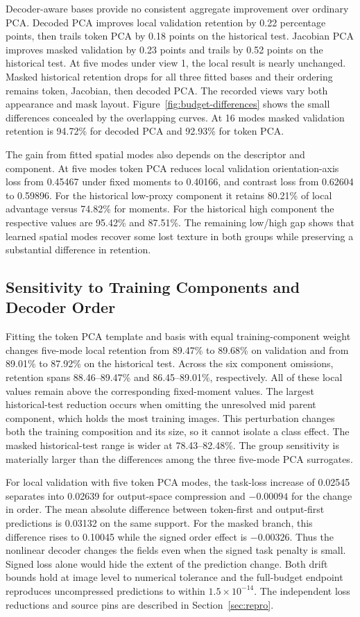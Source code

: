 Decoder-aware bases provide no consistent aggregate improvement over ordinary PCA. Decoded PCA improves local validation retention by 0.22 percentage points, then trails token PCA by 0.18 points on the historical test. Jacobian PCA improves masked validation by 0.23 points and trails by 0.52 points on the historical test. At five modes under view 1, the local result is nearly unchanged. Masked historical retention drops for all three fitted bases and their ordering remains token, Jacobian, then decoded PCA. The recorded views vary both appearance and mask layout. Figure~\ref{fig:budget-differences} shows the small differences concealed by the overlapping curves. At 16 modes masked validation retention is 94.72\% for decoded PCA and 92.93\% for token PCA.

The gain from fitted spatial modes also depends on the descriptor and component. At five modes token PCA reduces local validation orientation-axis loss from 0.45467 under fixed moments to 0.40166, and contrast loss from 0.62604 to 0.59896. For the historical low-proxy component it retains 80.21\% of local advantage versus 74.82\% for moments. For the historical high component the respective values are 95.42\% and 87.51\%. The remaining low/high gap shows that learned spatial modes recover some lost texture in both groups while preserving a substantial difference in retention.

\subsection{Sensitivity to Training Components and Decoder Order}
Fitting the token PCA template and basis with equal training-component weight changes five-mode local retention from 89.47\% to 89.68\% on validation and from 89.01\% to 87.92\% on the historical test. Across the six component omissions, retention spans 88.46--89.47\% and 86.45--89.01\%, respectively. All of these local values remain above the corresponding fixed-moment values. The largest historical-test reduction occurs when omitting the unresolved mid parent component, which holds the most training images. This perturbation changes both the training composition and its size, so it cannot isolate a class effect. The masked historical-test range is wider at 78.43--82.48\%. The group sensitivity is materially larger than the differences among the three five-mode PCA surrogates.

For local validation with five token PCA modes, the task-loss increase of 0.02545 separates into 0.02639 for output-space compression and $-0.00094$ for the change in order. The mean absolute difference between token-first and output-first predictions is 0.03132 on the same support. For the masked branch, this difference rises to 0.10045 while the signed order effect is $-0.00326$. Thus the nonlinear decoder changes the fields even when the signed task penalty is small. Signed loss alone would hide the extent of the prediction change. Both drift bounds hold at image level to numerical tolerance and the full-budget endpoint reproduces uncompressed predictions to within $1.5\times10^{-14}$. The independent loss reductions and source pins are described in Section~\ref{sec:repro}.

